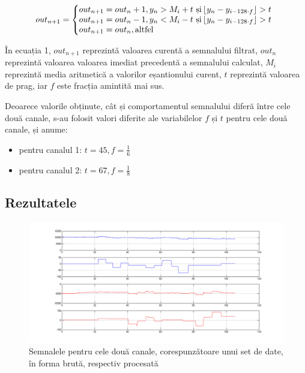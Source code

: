 \documentclass[12pt]{article}
\begin{document}
	\begin{equation}
	out_{n+1}=\left\{
	\begin{array}{@{} l c @{}}
	out_{n+1} = out_n + 1, y_n > M_i + t \mbox{ și} \left\lfloor y_n - y_{i-128 \cdot f} \right\rfloor > t\\
	out_{n+1} = out_n - 1, y_n < M_i - t \mbox{ și} \left\lfloor y_n - y_{i-128 \cdot f} \right\rfloor > t\\
	out_{n+1} = out_n, \mbox{altfel}
	\end{array}\right.
	\label{eq4}
	\end{equation}
	\begin{multicols}{2}
	În ecuația 1, $out_{n+1}$ reprezintă valoarea curentă a semnalului filtrat, $out_n$ reprezintă valoarea valoarea imediat precedentă a semnalului calculat, $M_i$ reprezintă media aritmetică a valorilor eșantionului curent, $t$ reprezintă valoarea de prag, iar $f$ este fracția amintită mai sus.
	
	Deoarece valorile obținute, cât și comportamentul semnalului diferă între cele două canale, s-au folosit valori diferite ale variabilelor $f$ și $t$ pentru cele două canale, și anume:
	\begin{itemize}[noitemsep, nolistsep]
		\item pentru canalul 1: $t = 45, f = \frac{1}{6}$
		\item pentru canalul 2: $t = 67, f = \frac{1}{8}$
	\end{itemize}
	\subsection*{Rezultatele}
	\end{multicols}
	
	\begin{figure}[h]
		\caption {Semnalele pentru cele două canale, corespunzătoare unui set de date, în forma brută, respectiv procesată}
		\includegraphics[width=\textwidth]{graph}	
	\end{figure}
	
\end{document}
